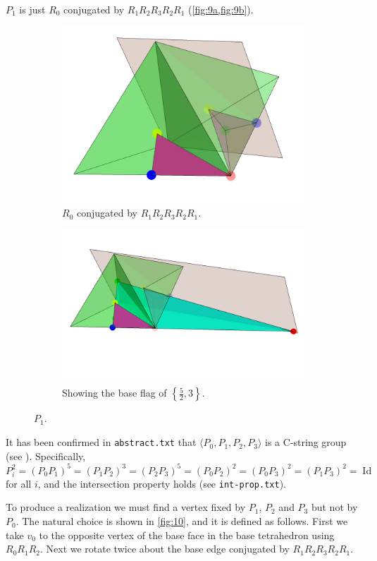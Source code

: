 \documentclass{article}
\theoremstyle{definition}
\DeclareMathOperator{\Id}{Id}
\begin{document}
	$P_1$ is just $R_0$ conjugated by $R_1R_2R_3R_2R_1$ (\cref{fig:9a,fig:9b}).
	
	\begin{figure}[H]
	\begin{center}
		\begin{subfigure}{\linewidth}
			\centering
			\includegraphics[width=0.5\linewidth]{fig9a}
			\caption{$R_0$ conjugated by $R_1R_2R_3R_2R_1$.}\label{fig:9a}
		\end{subfigure}
		\begin{subfigure}{\linewidth}
			\centering
			\includegraphics[width=0.9\linewidth]{fig9b}
			\caption{Showing the base flag of $\left\{\frac{5}{2},3\right\}$.}\label{fig:9b}
		\end{subfigure}
		\end{center}
		\caption{$P_1$.}
		\end{figure}
	
	It has been confirmed in \texttt{abstract.txt} that $\langle P_0,P_1,P_2,P_3\rangle$ is a C-string group (see ). Specifically,
		\[P_i^2=(P_0P_1)^5=(P_1P_2)^3=(P_2P_3)^5=(P_0P_2)^2=(P_0P_3)^2=(P_1P_3)^2=\Id\]
	for all $i$, and the intersection property holds (see \texttt{int-prop.txt}).
	

	To produce a realization we must find a vertex fixed by $P_1$, $P_2$ and $P_3$ but not by $P_0$. The natural choice is shown in \cref{fig:10}, and it is defined as follows. First we take $v_0$ to the opposite vertex of the base face in the base tetrahedron using $R_0R_1R_2$. Next we rotate twice about the base edge conjugated by $R_1R_2R_3R_2R_1$.
	
\end{document}
